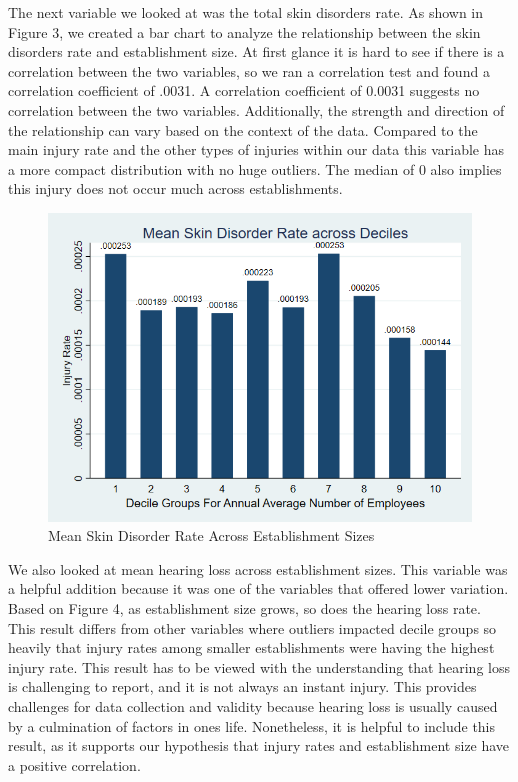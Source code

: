 \documentclass[12pt]{article}
\begin{document}
The next variable we looked at was the total skin disorders rate. As shown in Figure 3, we created a bar chart to analyze the relationship between the skin disorders rate and establishment size. At first glance it is hard to see if there is a correlation between the two variables, so we ran a correlation test and found a correlation coefficient of .0031. A correlation coefficient of 0.0031 suggests no correlation between the two variables. Additionally, the strength and direction of the relationship can vary based on the context of the data. Compared to the main injury rate and the other types of injuries within our data this variable has a more compact distribution with no huge outliers. The median of 0 also implies this injury does not occur much across establishments. 


\begin{figure}
    \centering
    \includegraphics[width=0.7\linewidth]{SkinDecileBar (2).png}
    \caption{Mean Skin Disorder Rate Across Establishment Sizes }
    \label{fig:enter-label}
\end{figure}
We also looked at mean hearing loss across establishment sizes. This variable was a helpful addition because it was one of the variables that offered lower variation. Based on Figure 4, as establishment size grows, so does the hearing loss rate. This result differs from other variables where outliers impacted decile groups so heavily that injury rates among smaller establishments were having the highest injury rate. This result has to be viewed with the understanding that hearing loss is challenging to report, and it is not always an instant injury. This provides challenges for data collection and validity because hearing loss is usually caused by a culmination of factors in ones life. Nonetheless, it is helpful to include this result, as it supports our hypothesis that injury rates and establishment size have a positive correlation. 
\end{document}
